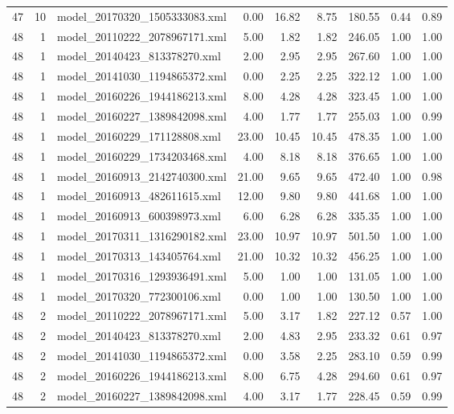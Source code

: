 \begin{table}[ht]
\begin{tabular}{rrlrrrrrr}
   47 &  10 & model\_20170320\_1505333083.xml & 0.00 & 16.82 & 8.75 & 180.55 & 0.44 & 0.89 \\ 
   48 &   1 & model\_20110222\_2078967171.xml & 5.00 & 1.82 & 1.82 & 246.05 & 1.00 & 1.00 \\ 
   48 &   1 & model\_20140423\_813378270.xml & 2.00 & 2.95 & 2.95 & 267.60 & 1.00 & 1.00 \\ 
   48 &   1 & model\_20141030\_1194865372.xml & 0.00 & 2.25 & 2.25 & 322.12 & 1.00 & 1.00 \\ 
   48 &   1 & model\_20160226\_1944186213.xml & 8.00 & 4.28 & 4.28 & 323.45 & 1.00 & 1.00 \\ 
   48 &   1 & model\_20160227\_1389842098.xml & 4.00 & 1.77 & 1.77 & 255.03 & 1.00 & 0.99 \\ 
   48 &   1 & model\_20160229\_171128808.xml & 23.00 & 10.45 & 10.45 & 478.35 & 1.00 & 1.00 \\ 
   48 &   1 & model\_20160229\_1734203468.xml & 4.00 & 8.18 & 8.18 & 376.65 & 1.00 & 1.00 \\ 
   48 &   1 & model\_20160913\_2142740300.xml & 21.00 & 9.65 & 9.65 & 472.40 & 1.00 & 0.98 \\ 
   48 &   1 & model\_20160913\_482611615.xml & 12.00 & 9.80 & 9.80 & 441.68 & 1.00 & 1.00 \\ 
   48 &   1 & model\_20160913\_600398973.xml & 6.00 & 6.28 & 6.28 & 335.35 & 1.00 & 1.00 \\ 
   48 &   1 & model\_20170311\_1316290182.xml & 23.00 & 10.97 & 10.97 & 501.50 & 1.00 & 1.00 \\ 
   48 &   1 & model\_20170313\_143405764.xml & 21.00 & 10.32 & 10.32 & 456.25 & 1.00 & 1.00 \\ 
   48 &   1 & model\_20170316\_1293936491.xml & 5.00 & 1.00 & 1.00 & 131.05 & 1.00 & 1.00 \\ 
   48 &   1 & model\_20170320\_772300106.xml & 0.00 & 1.00 & 1.00 & 130.50 & 1.00 & 1.00 \\ 
   48 &   2 & model\_20110222\_2078967171.xml & 5.00 & 3.17 & 1.82 & 227.12 & 0.57 & 1.00 \\ 
   48 &   2 & model\_20140423\_813378270.xml & 2.00 & 4.83 & 2.95 & 233.32 & 0.61 & 0.97 \\ 
   48 &   2 & model\_20141030\_1194865372.xml & 0.00 & 3.58 & 2.25 & 283.10 & 0.59 & 0.99 \\ 
   48 &   2 & model\_20160226\_1944186213.xml & 8.00 & 6.75 & 4.28 & 294.60 & 0.61 & 0.97 \\ 
   48 &   2 & model\_20160227\_1389842098.xml & 4.00 & 3.17 & 1.77 & 228.45 & 0.59 & 0.99 \\ 

\end{tabular}
\end{table}
